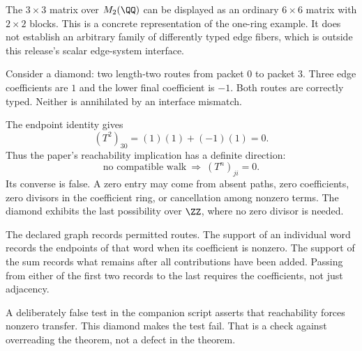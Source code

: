 The $3\times3$ matrix over $M_2(\QQ)$ can be displayed as an ordinary $6\times6$ matrix with $2\times2$ blocks. This is a concrete representation of the one-ring example. It does not establish an arbitrary family of differently typed edge fibers, which is outside this release's scalar edge-system interface.


Consider a diamond: two length-two routes from packet $0$ to packet $3$. Three edge coefficients are $1$ and the lower final coefficient is $-1$. Both routes are correctly typed. Neither is annihilated by an interface mismatch.


The endpoint identity gives
\[
(T^2)_{30}=(1)(1)+(-1)(1)=0.
\]
Thus the paper's reachability implication has a definite direction:
\[
\text{no compatible walk}\ \Longrightarrow\ (T^n)_{ji}=0.
\]
Its converse is false. A zero entry may come from absent paths, zero coefficients, zero divisors in the coefficient ring, or cancellation among nonzero terms. The diamond exhibits the last possibility over $\ZZ$, where no zero divisor is needed.

The declared graph records permitted routes. The support of an individual word records the endpoints of that word when its coefficient is nonzero. The support of the sum records what remains after all contributions have been added. Passing from either of the first two records to the last requires the coefficients, not just adjacency.

A deliberately false test in the companion script asserts that reachability forces nonzero transfer. This diamond makes the test fail. That is a check against overreading the theorem, not a defect in the theorem.


